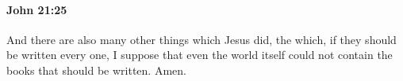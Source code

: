 		\paragraph{John 21:25} %
			\label{JOHN-21-25}

			And there are also many other things which Jesus did, the which, if they should be written every one, I suppose that even the world itself could not contain the books that should be written. Amen.

			\begin{framed}
				\scriptsize
				\begin{compactdesc}
					\item[SBLG] 
				\end{compactdesc}
			\end{framed}